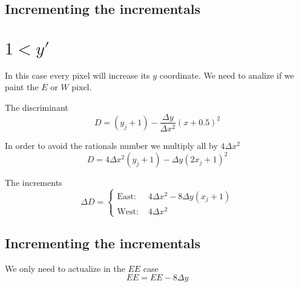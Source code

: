 \documentclass[a4paper]{article}
\begin{document}
		\subsection{Incrementing the incrementals}

	\section{ $1<y'$ }
		In this case every pixel will increase its $y$ coordinate.
		We need to analize if we paint the $E$ or $W$ pixel.

		The discriminant
		\[D = (y_j+1) - \frac{\Delta y}{\Delta x^2} (x+0.5)^2 \]

		In order to avoid the rationals number we multiply all by $4 \Delta x^2$
		\[ D = 4\Delta x^2 (y_j+1) -\Delta y (2x_j+1)^2 \]

		The increments
		\[ \Delta D = \left\{
			\begin{array}{ll}
				\mbox{East: } & 4 \Delta x^2 - 8 \Delta y (x_j + 1) \\
				\mbox{West: } & 4 \Delta x^2
			\end{array}
			\right.
		\]

		\subsection{Incrementing the incrementals}
			We only need to actualize in the $EE$ case
			\[EE = EE - 8\Delta y\]
\end{document}
